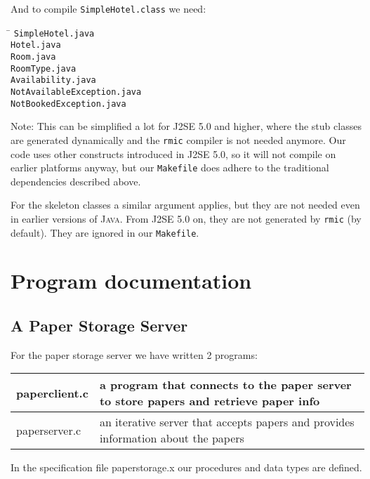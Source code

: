 \documentclass[a4paper,10pt]{article}
\begin{document}
And to compile \texttt{SimpleHotel.class} we need:
\begin{tabbing}
\hspace{20pt}\=\kill
 \> \texttt{SimpleHotel.java} \\
 \> \texttt{Hotel.java} \\
 \> \texttt{Room.java} \\
 \> \texttt{RoomType.java} \\
 \> \texttt{Availability.java} \\
 \> \texttt{NotAvailableException.java} \\
 \> \texttt{NotBookedException.java}
\end{tabbing}

Note: This can be simplified a lot for \textsc{J2SE 5.0} and higher,
where the stub classes are generated dynamically and the \texttt{rmic}
compiler is not needed anymore. Our code uses other constructs
introduced in \textsc{J2SE 5.0}, so it will not compile on earlier
platforms anyway, but our \texttt{Makefile} does adhere to the
traditional dependencies described above.

For the skeleton classes a similar argument applies, but they are not
needed even in earlier versions of \textsc{Java}. From \textsc{J2SE 5.0}
on, they are not generated by \texttt{rmic} (by default). They are
ignored in our \texttt{Makefile}.


\section{Program documentation}
\subsection{A Paper Storage Server}

For the paper storage server we have written 2 programs:
\begin{center}
\begin{tabular}{ l | p{9cm} }
paperclient.c & a program that connects to the paper server to store papers and retrieve paper info\\ \hline
paperserver.c & an iterative server that accepts papers and provides information about the papers\\
\end{tabular}
\end{center}

In the specification file paperstorage.x our procedures and data types are defined.
\end{document}
